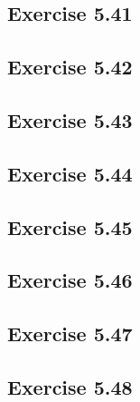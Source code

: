 \documentclass[../Marcus.tex]{subfiles}
\begin{document}
\subsection*{Exercise 5.41}

\subsection*{Exercise 5.42}

\subsection*{Exercise 5.43}

\subsection*{Exercise 5.44}

\subsection*{Exercise 5.45}

\subsection*{Exercise 5.46}

\subsection*{Exercise 5.47}

\subsection*{Exercise 5.48}
\end{document}
